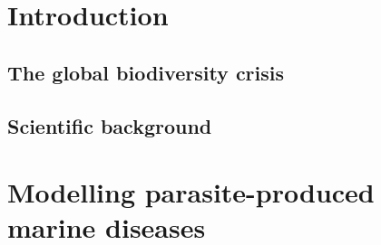 \documentclass[
	10pt, %
	fleqn, %
	a4paper, %
]{LegrandOrangeBook}
\begin{document}
{
\hypersetup{hidelinks}
\part{Introduction}
}

\chapterspaceabove{6.75cm}
\chapterspacebelow{7.25cm}

\chapter{The global biodiversity crisis}


\chapterspaceabove{6.75cm}
\chapterspacebelow{7.25cm}

\chapter{Scientific background}


{
	\hypersetup{hidelinks}
	\part{Modelling parasite-produced marine diseases}
}


\chapterspaceabove{7.75cm}
\chapterspacebelow{7.25cm}
\end{document}
